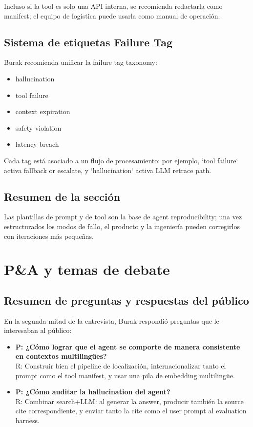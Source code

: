 \documentclass[a4paper]{article}
\begin{document}
Incluso si la tool es solo una API interna, se recomienda redactarla como manifest; el equipo de logística puede usarla como manual de operación.

\subsection{Sistema de etiquetas Failure Tag}

Burak recomienda unificar la failure tag taxonomy:

\begin{itemize}
    \item hallucination
    \item tool failure
    \item context expiration
    \item safety violation
    \item latency breach
\end{itemize}

Cada tag está asociado a un flujo de procesamiento: por ejemplo, `tool failure` activa fallback or escalate, y `hallucination` activa LLM retrace path.

\subsection{Resumen de la sección}

Las plantillas de prompt y de tool son la base de agent reproducibility; una vez estructurados los modos de fallo, el producto y la ingeniería pueden corregirlos con iteraciones más pequeñas.

\section{P\&A y temas de debate}

\subsection{Resumen de preguntas y respuestas del público}

En la segunda mitad de la entrevista, Burak respondió preguntas que le interesaban al público:

\begin{itemize}
    \item \textbf{P: ¿Cómo lograr que el agent se comporte de manera consistente en contextos multilingües?}\\
    R: Construir bien el pipeline de localización, internacionalizar tanto el prompt como el tool manifest, y usar una pila de embedding multilingüe.
    \item \textbf{P: ¿Cómo auditar la hallucination del agent?}\\
    R: Combinar search+LLM: al generar la answer, producir también la source cite correspondiente, y enviar tanto la cite como el user prompt al evaluation harness.
\end{itemize}
\end{document}
